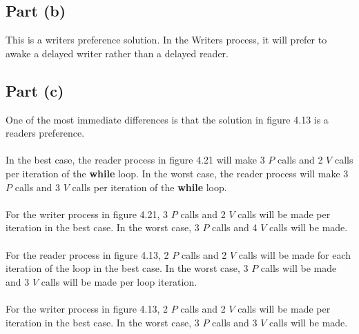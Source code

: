 \documentclass{article}%
\begin{document}
\subsection*{Part (b)}
This is a writers preference solution. In the Writers process, it will prefer to awake a delayed writer rather than a
delayed reader.

\subsection*{Part (c)}
One of the most immediate differences is that the solution in figure 4.13 is a readers preference.\\
\\
In the best case, the reader process in figure 4.21 will make 3 $P$ calls and 2 $V$ calls per iteration of the
\textbf{while} loop. In the worst case, the reader process will make 3 $P$ calls and 3 $V$ calls per iteration of the
\textbf{while} loop.\\
\\
For the writer process in figure 4.21, 3 $P$ calls and 2 $V$ calls will be made per iteration in the best case. In the
worst case, 3 $P$ calls and 4 $V$ calls will be made.\\
\\
For the reader process in figure 4.13, 2 $P$ calls and 2 $V$ calls will be made for each iteration of the loop in the
best case. In the worst case, 3 $P$ calls will be made and 3 $V$ calls will be made per loop iteration.\\
\\
For the writer process in figure 4.13, 2 $P$ calls and 2 $V$ calls will be made per iteration in the best case. In the
worst case, 3 $P$ calls and 3 $V$ calls will be made.\\
\end{document}
